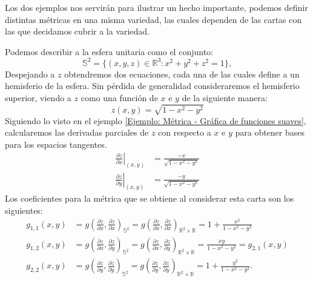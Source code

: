Los dos ejemplos nos servirán para ilustrar un hecho importante, podemos definir distintas métricas en una misma variedad, las cuales dependen de las cartas con las que decidamos cubrir a la variedad.

\begin{example}[Esfera]
	Podemos describir a la esfera unitaria como el conjunto:
	\[
		\mathbb{S}^{2} = \{(x,y,z) \in \mathbb{R}^{3}: x^{2} + y^{2} + z^{2} = 1\},
	\]
	Despejando a $z$ obtendremos dos ecuaciones, cada una de las cuales define a un hemisferio de la esfera. Sin pérdida de generalidad consideraremos el hemisferio superior, viendo a $z$ como una función de $x$ e $y$ de la siguiente manera:
	\[
		z(x,y) = \sqrt{1 - x^{2} - y^{2}}
	\]
	Siguiendo lo visto en el ejemplo \ref{Ejemplo: Métrica - Gráfica de funciones suaves}, calcularemos las derivadas parciales de $z$ con respecto a $x$ e $y$ para obtener bases para los espacios tangentes.
	\begin{align*}
		\left. \frac{\partial z}{\partial x} \right|_{(x,y)} & =
		\frac{-x}{\sqrt{1 - x^{2} - y^{2}}}                      \\
		\left. \frac{\partial z}{\partial y} \right|_{(x,y)} & =
		\frac{-y}{\sqrt{1 - x^{2} - y^{2}}}
	\end{align*}
	Los coeficientes para la métrica que se obtiene al considerar esta carta son los siguientes:
	\begin{align*}
		g_{1,1}(x,y) & = g\left(
		\frac{\partial z}{\partial x},\frac{\partial z}{\partial x}
		\right)_{\mathbb{S}^{2}} =
		g\left(
		\frac{\partial z}{\partial x},\frac{\partial z}{\partial x}
		\right)_{\mathbb{R}^{2} \times \mathbb{R}}
		= 1 + \frac{x^{2}}{1 - x^{2} - y^{2}}         \\[12pt]
		g_{1,2}(x,y) & = g\left(
		\frac{\partial z}{\partial x},\frac{\partial z}{\partial y}
		\right)_{\mathbb{S}^{2}} =
		g\left(
		\frac{\partial z}{\partial x},\frac{\partial z}{\partial y}
		\right)_{\mathbb{R}^{2} \times \mathbb{R}}
		= \frac{xy}{1 - x^{2} - y^{2}} = g_{2,1}(x,y) \\[12pt]
		g_{2,2}(x,y) & = g\left(
		\frac{\partial z}{\partial y},\frac{\partial z}{\partial y}
		\right)_{\mathbb{S}^{2}} =
		g\left(
		\frac{\partial z}{\partial y},\frac{\partial z}{\partial y}
		\right)_{\mathbb{R}^{2} \times \mathbb{R}}
		= 1 + \frac{y^{2}}{1 - x^{2} - y^{2}}.
	\end{align*}



\end{example}
